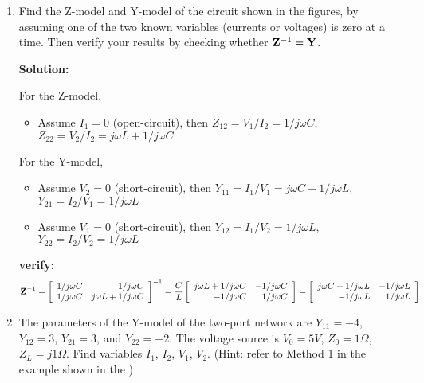 \begin{enumerate}
\item Find the Z-model and Y-model of the circuit shown in the figures, by
assuming one of the two known variables (currents or voltages) is zero at
a time. Then verify your results by checking whether ${\bf Z}^{-1}={\bf Y}$.


  {\bf Solution:}

  For the Z-model, 
  \begin{itemize}
  item Assume $I_2=0$ (open-circuit), then
  	$Z_{11}=V_1/I_1=1/j\omega C$, $Z_{21}=V_2/I_1=1/j\omega C$
  \item Assume $I_1=0$ (open-circuit), then
  	$Z_{12}=V_1/I_2=1/j\omega C$, $Z_{22}=V_2/I_2=j\omega L+1/j\omega C$
  \end{itemize}
  For the Y-model, 
  \begin{itemize}
  \item Assume $V_2=0$ (short-circuit), then
  	$Y_{11}=I_1/V_1=j\omega C+1/j\omega L$, $Y_{21}=I_2/V_1=1/j\omega L$
  \item Assume $V_1=0$ (short-circuit), then
  	$Y_{12}=I_1/V_2=1/j\omega L$, $Y_{22}=I_2/V_2=1/j\omega L$
  \end{itemize}
  {\bf verify:}
  \[ {\bf Z}^{-1}=\left[ \begin{array}{rr} 1/j\omega C & 1/j\omega C \\
  	1/j\omega C & j\omega L+1/j\omega C \end{array} \right]^{-1}
  	=\frac{C}{L}\left[ \begin{array}{rr} j\omega L+1/j\omega C & -1/j\omega C \\
  	-1/j\omega C & 1/j\omega C \end{array} \right]
  	=\left[ \begin{array}{rr} j\omega C+1/j\omega L & -1/j\omega L \\
  	-1/j\omega L & 1/j\omega L \end{array} \right]
  \]


\item The parameters of the Y-model of the two-port network are $Y_{11}=-4$, 
$Y_{12}=3$, $Y_{21}=3$, and $Y_{22}=-2$. The voltage source is $V_0=5V$, 
$Z_0=1\Omega$, $Z_L=j1\Omega$. Find variables $I_1$, $I_2$, $V_1$, $V_2$. 
(Hint: refer to Method 1 in the example shown in the
)



\end{enumerate}
